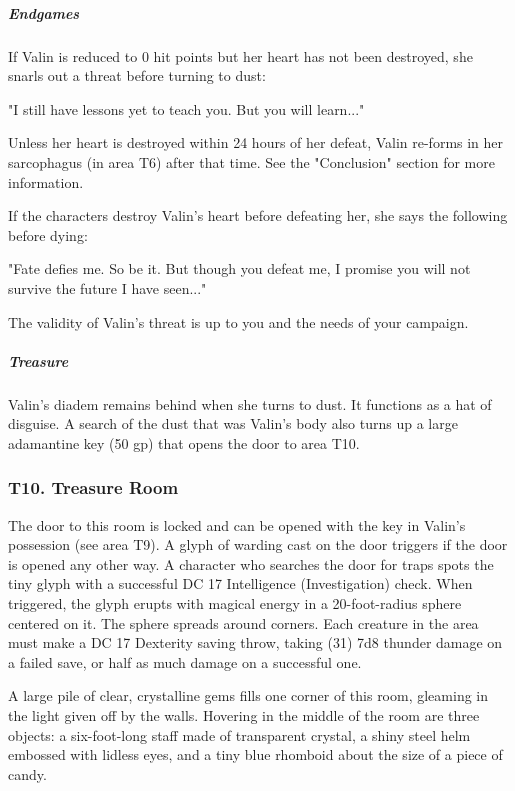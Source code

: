 \documentclass[10pt,a4paper,twoside,bg=print,twocolumn,openany,nodeprecatedcode]{dndbook}
\begin{document}
\subparagraph{Endgames}
If Valin is reduced to 0 hit points but her heart has not been destroyed, she snarls out a threat before turning to dust:

\begin{DndReadAloud}{}
"I still have lessons yet to teach you. But you will learn..."

\end{DndReadAloud}

Unless her heart is destroyed within 24 hours of her defeat, Valin re-forms in her sarcophagus (in area T6) after that time. See the "Conclusion" section for more information.

If the characters destroy Valin's heart before defeating her, she says the following before dying:

\begin{DndReadAloud}{}
"Fate defies me. So be it. But though you defeat me, I promise you will not survive the future I have seen..."

\end{DndReadAloud}

The validity of Valin's threat is up to you and the needs of your campaign.

\subparagraph{Treasure}
Valin's diadem remains behind when she turns to dust. It functions as a hat of disguise. A search of the dust that was Valin's body also turns up a large adamantine key (50 gp) that opens the door to area T10.

\subsubsection{T10. Treasure Room}
The door to this room is locked and can be opened with the key in Valin's possession (see area T9). A glyph of warding cast on the door triggers if the door is opened any other way. A character who searches the door for traps spots the tiny glyph with a successful DC 17 Intelligence (Investigation) check. When triggered, the glyph erupts with magical energy in a 20-foot-radius sphere centered on it. The sphere spreads around corners. Each creature in the area must make a DC 17 Dexterity saving throw, taking (31) 7d8 thunder damage on a failed save, or half as much damage on a successful one.

\begin{DndReadAloud}{}
A large pile of clear, crystalline gems fills one corner of this room, gleaming in the light given off by the walls. Hovering in the middle of the room are three objects: a six-foot-long staff made of transparent crystal, a shiny steel helm embossed with lidless eyes, and a tiny blue rhomboid about the size of a piece of candy.

\end{DndReadAloud}
\end{document}
